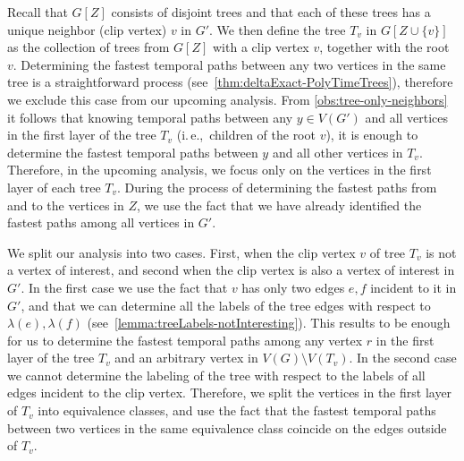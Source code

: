 \documentclass[a4paper,UKenglish,cleveref, autoref, thm-restate]{lipics-v2021}
\newcommand{\ie}{i.\,e.,\ }
\begin{document}
Recall that $G[Z]$ consists of disjoint trees and that each of these trees has a unique neighbor (clip vertex) $v$ in $G'$. We then define the tree $T_v$ in $G[Z \cup \{v\}]$ as the collection of trees from $G[Z]$ with a clip vertex $v$, together with the root $v$. 
Determining the fastest temporal paths between any two vertices in the same tree is a straightforward process (see~\cref{thm:deltaExact-PolyTimeTrees}), therefore we exclude this case from our upcoming analysis.
From \cref{obs:tree-only-neighbors} it follows that knowing temporal paths between any $y  \in V(G')$ and all vertices in the first layer of the tree $T_v$ (\ie children of the root $v$),
it is enough to determine the fastest temporal paths between $y$ and all other vertices in $T_v$.
Therefore,
in the upcoming analysis, we focus only on the vertices in the first layer of each tree $T_v$.
During the process of determining the fastest paths from and to the vertices in $Z$, we use the fact that we have already identified the fastest paths among all vertices in $G'$.

We split our analysis into two cases.
First, when the clip vertex $v$ of tree $T_v$ is not a vertex of interest,
and second when the clip vertex is also a vertex of interest in $G'$.
%
In the first case we use the fact that $v$ has only two edges $e,f$ incident to it in $G'$, and that we can determine all the labels of the tree edges with respect to $\lambda(e),\lambda(f)$ (see~\cref{lemma:treeLabels-notInteresting}).
This results to be enough for us to determine the fastest temporal paths among any vertex $r$ in the first layer of the tree $T_v$ and an arbitrary vertex in $V(G)\setminus V(T_v)$.
%
In the second case we cannot determine the labeling of the tree with respect to the labels of all edges incident to the clip vertex.
Therefore, we split the vertices in the first layer of $T_v$ into equivalence classes, and use the fact that the fastest temporal paths between two vertices in the same equivalence class coincide on the edges outside of $T_v$.
\end{document}
